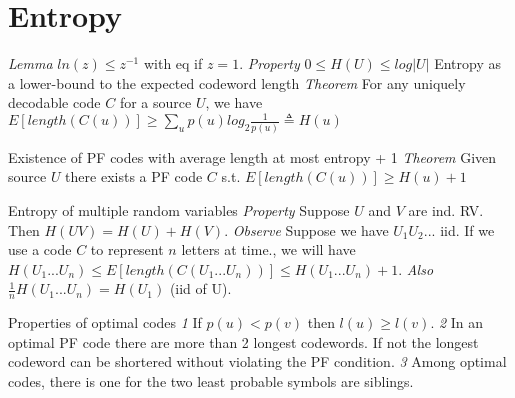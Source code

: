 \documentclass[12pt,a4paper,oneside]{article} %
\newcommand{\concept}[1]{\textcolor{rtLightBlue900}{#1}}
\newcommand{\subconcept}[1]{\textcolor{rtLightBlue900}{\textit{#1}}}
\begin{document}
\section{Entropy}
\subconcept{Lemma} $ln(z)\le z^{-1}$ with eq if $z=1$.
\subconcept{Property} $0 \le H(U) \le log |U|$
\concept{Entropy as a lower-bound to the expected codeword length} 
\subconcept{Theorem} For any uniquely decodable code $C$ for a source $U$, we have $E\left[ length(C(u)) \right] \ge \sum_{u}p(u)log_2 \frac{1}{p(u)} \triangleq H(u)$

\concept{Existence of PF codes with average length at most entropy + 1}
\subconcept{Theorem} Given source $U$ there exists a PF code $C$ s.t. 
$E\left[ length(C(u)) \right] \ge H(u)+1$
 
\concept{Entropy of multiple random variables} 
\subconcept{Property} Suppose $U$ and $V$ are ind. RV.
Then $H(UV)=H(U)+H(V)$.
\subconcept{Observe} Suppose we have $U_1U_2...$ iid. If we use a code $C$ to represent $n$ letters at time., we will have $H(U_1...U_n) \le E\left[ length(C(U_1...U_n)) \right] \le H(U_1...U_n)+1$.
\subconcept{Also} $\frac{1}{n} H(U_1...U_n) = H(U_1)$ (iid of U).

\concept{Properties of optimal codes} 
\subconcept{1} If $p(u) < p(v)$ then $l(u) \ge l(v)$.
\subconcept{2} In an optimal PF code there are more than 2 longest codewords. If not the longest codeword can be shortered without violating the PF condition.
\subconcept{3} Among optimal codes, there is one for the two least probable symbols are siblings.
\end{document}

